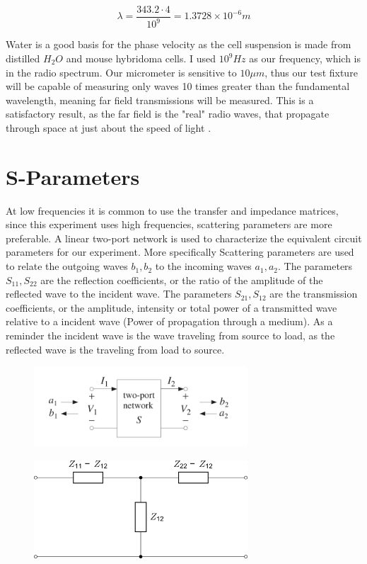 \documentclass[journal]{IEEEtran}
\begin{document}
\begin{equation}
\label{near-wavelength-water}
\lambda = \frac{343.2 \cdot 4}{10^9} = 1.3728 \times 10^{-6} m
\end{equation}

Water is a good basis for the phase velocity as the cell suspension is made from distilled $H_2O$ and mouse hybridoma cells. I used $10^9 Hz$ as our frequency, which is in the radio spectrum. Our micrometer is sensitive to $10\mu m$, thus our test fixture will be capable of measuring only waves 10 times greater than the fundamental wavelength, meaning far field transmissions will be measured. This is a satisfactory result, as the far field is the "real" radio waves, that propagate through space at just about the speed of light \cite{near-far-em}. 

\section{S-Parameters}
At low frequencies it is common to use the transfer and impedance matrices, since this experiment uses high frequencies, scattering parameters are more preferable. A linear two-port network is used to characterize the equivalent circuit parameters for our experiment. More specifically Scattering parameters are used to relate the outgoing waves $b_1,b_2$ to the incoming waves $a_1,a_2$. The parameters $S_{11},S_{22}$ are the reflection coefficients, or the ratio of the amplitude of the reflected wave to the incident wave. The parameters $S_{21},S_{12}$ are the transmission coefficients, or the amplitude, intensity or total power of a transmitted wave relative to a incident wave (Power of propagation through a medium). As a reminder the incident wave is the wave traveling from source to load, as the reflected wave is the traveling from load to source.

\begin{figure}[ht]
\label{Equivalent_Circuit}
\includegraphics[width=8cm]{two_port.png}
\end{figure}

\begin{figure}[ht]
\label{Equivalent_Circuit}
\includegraphics[width=8cm]{Equivalent_Circuit.png}
\end{figure}
\end{document}
